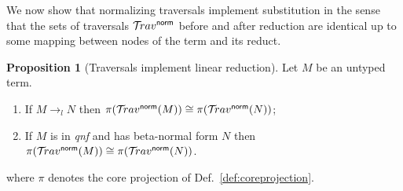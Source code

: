 \documentclass{article}
\theoremstyle{definition}
\newtheorem{proposition}{Proposition}[section]
\newcommand{\normalizing}{{\sf norm}}
\newcommand{\travsetnorm}{\travset^\normalizing}
\def\coresymbol{\pi} %
\begin{document}
We now show that normalizing traversals implement substitution in the sense that
the sets of traversals $\travsetnorm$ before and after reduction are identical up to some mapping between nodes of the term and its reduct.
\begin{proposition}[Traversals implement linear reduction]
\label{prop:ulctrav_impl_linear_reduction}
Let $M$ be an untyped term.
\begin{enumerate}[label=(\roman*)]
\item If $M \rightarrow_l N$ then $\pi(\travsetnorm(M)) \cong \pi(\travsetnorm(N))$;
\item If $M$ is in \emph{qnf} and has beta-normal form $N$ then $\coresymbol(\travsetnorm(M)) \cong \coresymbol(\travsetnorm(N))$.
\end{enumerate}
where $\coresymbol$ denotes the core projection of Def.~\ref{def:coreprojection}.
\end{proposition}
\end{document}
